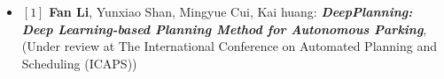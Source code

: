   \begin{itemize}[leftmargin=*]
    \item
     $[1]$ \textbf{Fan Li}, Yunxiao Shan, Mingyue Cui, Kai huang: \textbf{\textit{DeepPlanning: Deep Learning-based Planning Method for Autonomous Parking}}, (Under review at The International Conference on Automated Planning and Scheduling (ICAPS))
    
  \end{itemize}



